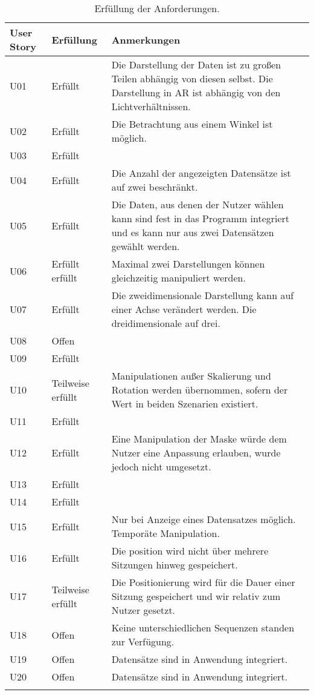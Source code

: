 \begin{longtable} {p{}p{}p{}}
\toprule
User Story & Erfüllung & Anmerkungen \\
\toprule
U01 & Erfüllt & Die Darstellung der Daten ist zu großen Teilen abhängig von diesen selbst. Die Darstellung in AR ist abhängig von den Lichtverhältnissen.\\
\midrule 
U02 & Erfüllt & Die Betrachtung aus einem Winkel ist möglich.\\
\midrule 
U03 & Erfüllt & \\
\midrule 
U04 & Erfüllt & Die Anzahl der angezeigten Datensätze ist auf zwei beschränkt.\\
\midrule 
U05 & Erfüllt & Die Daten, aus denen der Nutzer wählen kann sind fest in das Programm integriert und es kann nur aus zwei Datensätzen gewählt werden.\\
\midrule
U06 & Erfüllt erfüllt & Maximal zwei Darstellungen können gleichzeitig manipuliert werden. \\
\midrule 
U07 & Erfüllt & Die zweidimensionale Darstellung kann auf einer Achse verändert werden. Die dreidimensionale auf drei.\\
\midrule 
U08 & Offen & \\
\midrule 
U09 & Erfüllt & \\
\midrule 
U10 & Teilweise erfüllt & Manipulationen außer Skalierung und Rotation werden übernommen, sofern der Wert in beiden Szenarien existiert.\\
\midrule 
U11  & Erfüllt & \\
\midrule
U12 & Erfüllt & Eine Manipulation der Maske würde dem Nutzer eine Anpassung erlauben, wurde jedoch nicht umgesetzt.\\
\midrule 
U13 & Erfüllt & \\
\midrule 
U14 & Erfüllt & \\
\midrule 
U15 & Erfüllt & Nur bei Anzeige eines Datensatzes möglich. Temporäte Manipulation.\\
\midrule 
U16 & Erfüllt & Die position wird nicht über mehrere Sitzungen hinweg gespeichert.\\
\midrule 
U17 & Teilweise erfüllt & Die Positionierung wird für die Dauer einer Sitzung gespeichert und wir relativ zum Nutzer gesetzt.\\
\midrule 
U18 & Offen & Keine unterschiedlichen Sequenzen standen zur Verfügung.\\
\midrule 
U19 & Offen & Datensätze sind in Anwendung integriert.\\
\midrule 
U20 & Offen & Datensätze sind in Anwendung integriert.\\

\bottomrule
\caption{\label{tab:evaluation}Erfüllung der Anforderungen.}
\end{longtable}

